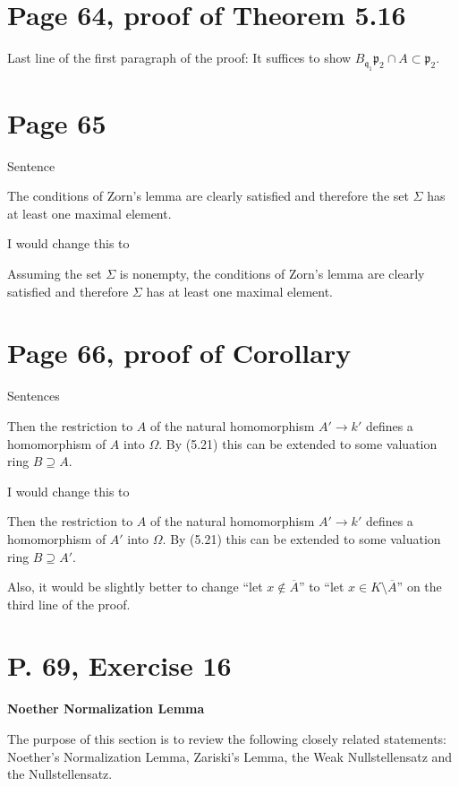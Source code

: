 \documentclass[12pt]{article}
\newcommand{\mf}{\mathfrak}
\begin{document}
\section{Page 64, proof of Theorem 5.16}%

Last line of the first paragraph of the proof: It suffices to show $B_{\mf q_1}\mf p_2\cap A\subset\mf p_2$.

\section{Page 65}%

Sentence

The conditions of Zorn's lemma are clearly satisfied and therefore the set $\Sigma$ has at least one maximal element.

I would change this to 

Assuming the set $\Sigma$ is nonempty, the conditions of Zorn's lemma are clearly satisfied and therefore $\Sigma$ has at least one maximal element.

\section{Page 66, proof of Corollary}

Sentences

Then the restriction to $A$ of the natural homomorphism $A'\to k'$ defines a homomorphism of $A$ into $\Omega$. By (5.21) this can be extended to some valuation ring $B\supseteq A$.

I would change this to 

Then the restriction to $A$ of the natural homomorphism $A'\to k'$ defines a homomorphism of $A'$ into $\Omega$. By (5.21) this can be extended to some valuation ring $B\supseteq A'$.

Also, it would be slightly better to change ``let $x\notin\overline A$'' to ``let $x\in K\setminus\overline A$'' on the third line of the proof.\bigskip

\section{P. 69, Exercise 16}%

\textbf{\Large Noether Normalization Lemma}

The purpose of this section is to review the following closely related statements: Noether's Normalization Lemma, Zariski's Lemma, the Weak Nullstellensatz and the Nullstellensatz.
\end{document}
